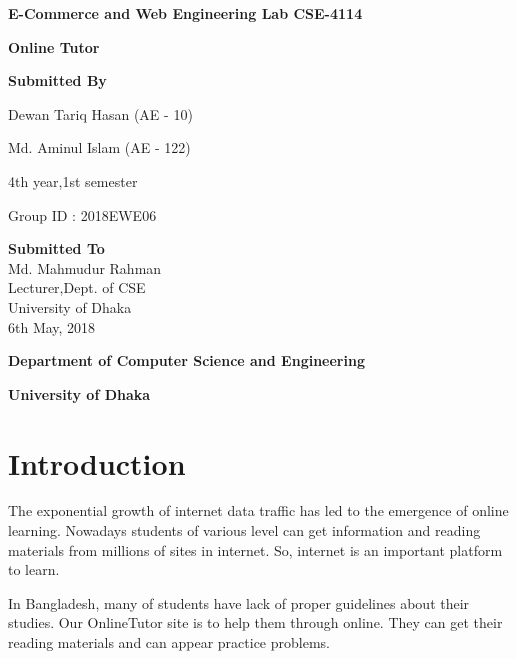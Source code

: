 \documentclass[12pt]{article}
\begin{document}
\begin{titlepage}
\centering



\vspace{1cm}

{\Large \bfseries E-Commerce and Web Engineering Lab CSE-4114}

\vspace{1cm}
{\Large \bfseries Online Tutor}

\vspace{2.5cm}
{\large \bfseries Submitted By}

\vspace{0.5cm}
{\large Dewan Tariq Hasan (AE - 10)}

{\large Md. Aminul Islam (AE - 122)}

{\large 4th year,1st semester}

{\large Group ID : 2018EWE06\vspace{1cm}}

{\large \bfseries Submitted To\\}
\vspace{0.5cm}
{\large Md. Mahmudur Rahman\\Lecturer,Dept. of CSE\\University of Dhaka}
\\
\vspace{1cm}
{\large 6th May, 2018}
\vspace{1cm}
\vfill


{\large \bfseries Department of Computer Science and Engineering}

{\large \bfseries University of Dhaka}
\end{titlepage}
%
\tableofcontents
\newpage
%
%
\section{Introduction}
\par The exponential growth of internet data traffic has led to the emergence of online learning. Nowadays students of various level can get information and reading materials from millions of sites in internet. So, internet is an important platform to learn. 
%  
\vspace{0.5cm}
%
\par In Bangladesh, many of students have lack of proper guidelines about their studies. Our OnlineTutor site is to help them through online. They can get their reading materials and can appear practice problems. 
%
%
\vspace{0.5cm}
%
%
\end{document}
